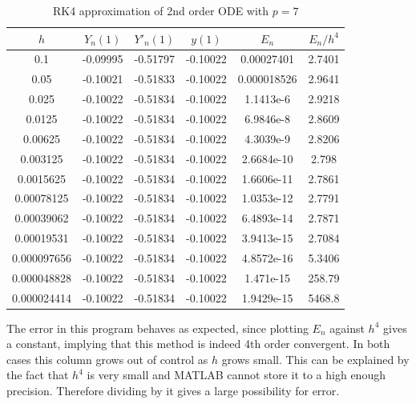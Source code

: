 \documentclass[10pt,a4paper,notitlepage]{article}
\begin{document}
\begin{table}[H]
\centering
\begin{tabular}{|c|c|c|c|c|c|} \hline $h$&$Y_{n}(1)$&$Y'_{n}(1)$&$y(1)$&$E_{n}$&$E_{n}/h^{4}$ \\ \hline 0.1 & -0.09995 & -0.51797 & -0.10022 & 0.00027401 & 2.7401\\ 0.05 & -0.10021 & -0.51833 & -0.10022 & 0.000018526 & 2.9641\\ 0.025 & -0.10022 & -0.51834 & -0.10022 & 1.1413e-6 & 2.9218\\ 0.0125 & -0.10022 & -0.51834 & -0.10022 & 6.9846e-8 & 2.8609\\ 0.00625 & -0.10022 & -0.51834 & -0.10022 & 4.3039e-9 & 2.8206\\ 0.003125 & -0.10022 & -0.51834 & -0.10022 & 2.6684e-10 & 2.798\\ 0.0015625 & -0.10022 & -0.51834 & -0.10022 & 1.6606e-11 & 2.7861\\ 0.00078125 & -0.10022 & -0.51834 & -0.10022 & 1.0353e-12 & 2.7791\\ 0.00039062 & -0.10022 & -0.51834 & -0.10022 & 6.4893e-14 & 2.7871\\ 0.00019531 & -0.10022 & -0.51834 & -0.10022 & 3.9413e-15 & 2.7084\\ 0.000097656 & -0.10022 & -0.51834 & -0.10022 & 4.8572e-16 & 5.3406\\ 0.000048828 & -0.10022 & -0.51834 & -0.10022 & 1.471e-15 & 258.79\\ 0.000024414 & -0.10022 & -0.51834 & -0.10022 & 1.9429e-15 & 5468.8\\ \hline \end{tabular}
\caption{RK4 approximation of 2nd order ODE with $p=7$}
\label{tab:P=7}
\end{table}
The error in this program behaves as expected, since plotting $E_{n}$ against $h^{4}$ gives a constant,  implying that this method is indeed 4th order convergent. In both cases this column grows out of control as $h$ grows small. This can be explained by the fact that $h^{4}$ is very small and MATLAB cannot store it to a high enough precision. Therefore dividing by it gives a large possibility for error. 
\end{document}

